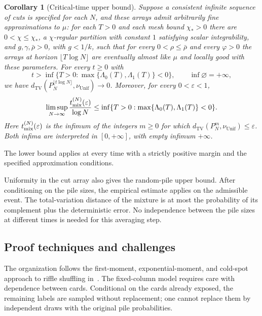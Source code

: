 \documentclass[11pt]{article}
\numberwithin{equation}{section}
\newtheorem{corollary}[theorem]{Corollary}
\theoremstyle{definition}
\theoremstyle{remark}
\newcommand{\TV}{\mathrm{TV}}
\newcommand{\Unif}{\mathrm{Unif}}
\newcommand{\dTV}{d_{\TV}}
\newcommand{\nuUnif}{\nu_{\Unif}}
\newcommand{\1}{\mathbf 1}
\begin{document}
\begin{corollary}[Critical-time upper bound]%
\label{cor:upper-critical}
Suppose a consistent infinite sequence of cuts is specified for each
$N$, and these arrays admit arbitrarily fine approximations to $\mu$:
for each $T>0$ and each mesh bound $\chi_*>0$ there are
$0<\chi\le\chi_*$, a $\chi$-regular partition with constant $1$ satisfying
scalar integrability, and $g,\gamma,\bar\rho>0$, with $g<1/k$,
such that for every $0<\rho\le\bar\rho$ and every $\varphi>0$ the
arrays at horizon $\lfloor T\log N\rfloor$ are eventually almost
like $\mu$ and locally good with these parameters. For every $t\ge0$ with
\[
 t>\inf\{T>0:\max\{\Lambda_0(T),\Lambda_1(T)\}<0\},
 \qquad \inf\varnothing=+\infty,
\]
we have $\dTV(P_N^{\lfloor t\log N\rfloor},\nuUnif)\to0$.
Moreover, for every $0<\varepsilon<1$,
\[
 \limsup_{N\to\infty}\frac{t_{\rm mix}^{(N)}(\varepsilon)}{\log N}
       \le\inf\{T>0:\max\{\Lambda_0(T),\Lambda_1(T)\}<0\}.
\]
Here $t_{\rm mix}^{(N)}(\varepsilon)$ is the infimum of the integers
$m\ge0$ for which $\dTV(P_N^m,\nuUnif)\le\varepsilon$.
Both infima are interpreted in $[0,+\infty]$, with empty infimum
$+\infty$.
\end{corollary}

The lower bound applies at every time with a strictly positive margin
and the specified approximation conditions.

Uniformity in the cut array also gives the random-pile upper bound. After
conditioning on the pile sizes, the empirical estimate applies on the
admissible event. The total-variation distance of the mixture is at most
the probability of its complement plus the deterministic error. No
independence between the pile sizes at different times is needed for this
averaging step.

\subsection{Proof techniques and challenges}

The organization follows the first-moment, exponential-moment, and
cold-spot approach to riffle shuffling in~\cite{SSW}. The fixed-column model
requires care with dependence between cards. Conditional on the cards
already exposed, the remaining labels are sampled without replacement;
one cannot replace them by independent draws with the original pile
probabilities.
\end{document}
